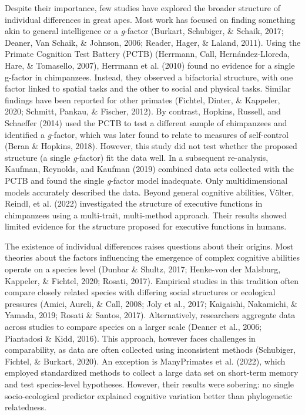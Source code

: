 \documentclass[
  man,floatsintext]{apa6}
\begin{document}
Despite their importance, few studies have explored the broader structure of individual differences in great apes. Most work has focused on finding something akin to general intelligence or a \emph{g}-factor (Burkart, Schubiger, \& Schaik, 2017; Deaner, Van Schaik, \& Johnson, 2006; Reader, Hager, \& Laland, 2011). Using the Primate Cognition Test Battery (PCTB) (Herrmann, Call, Hernández-Lloreda, Hare, \& Tomasello, 2007), Herrmann et al. (2010) found no evidence for a single g-factor in chimpanzees. Instead, they observed a bifactorial structure, with one factor linked to spatial tasks and the other to social and physical tasks. Similar findings have been reported for other primates (Fichtel, Dinter, \& Kappeler, 2020; Schmitt, Pankau, \& Fischer, 2012). By contrast, Hopkins, Russell, and Schaeffer (2014) used the PCTB to test a different sample of chimpanzees and identified a \emph{g}-factor, which was later found to relate to measures of self-control (Beran \& Hopkins, 2018). However, this study did not test whether the proposed structure (a single \emph{g}-factor) fit the data well. In a subsequent re-analysis, Kaufman, Reynolds, and Kaufman (2019) combined data sets collected with the PCTB and found the single \emph{g}-factor model inadequate. Only multidimensional models accurately described the data. Beyond general cognitive abilities, Völter, Reindl, et al. (2022) investigated the structure of executive functions in chimpanzees using a multi-trait, multi-method approach. Their results showed limited evidence for the structure proposed for executive functions in humans.

The existence of individual differences raises questions about their origins. Most theories about the factors influencing the emergence of complex cognitive abilities operate on a species level (Dunbar \& Shultz, 2017; Henke-von der Malsburg, Kappeler, \& Fichtel, 2020; Rosati, 2017). Empirical studies in this tradition often compare closely related species with differing social structures or ecological pressures (Amici, Aureli, \& Call, 2008; Joly et al., 2017; Kaigaishi, Nakamichi, \& Yamada, 2019; Rosati \& Santos, 2017). Alternatively, researchers aggregate data across studies to compare species on a larger scale (Deaner et al., 2006; Piantadosi \& Kidd, 2016). This approach, however faces challenges in comparability, as data are often collected using inconsistent methods (Schubiger, Fichtel, \& Burkart, 2020). An exception is ManyPrimates et al. (2022), which employed standardized methods to collect a large data set on short-term memory and test species-level hypotheses. However, their results were sobering: no single socio-ecological predictor explained cognitive variation better than phylogenetic relatedness.
\end{document}
